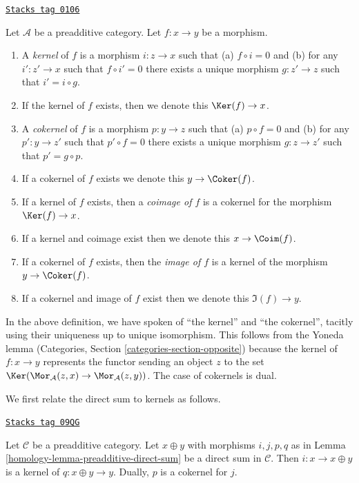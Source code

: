 \begin{definition}[Kernel]
\label{homology-definition-kernel}
\href{https://stacks.math.columbia.edu/tag/0106}{\texttt{Stacks tag 0106}}

Let $\mathcal{A}$ be a preadditive category.
Let $f : x \to y$ be a morphism.
\begin{enumerate}
\item A {\it kernel} of $f$ is a morphism
$i : z \to x$ such that (a) $f \circ i = 0$ and (b)
for any $i' : z' \to x$ such that $f \circ i' = 0$ there
exists a unique morphism $g : z' \to z$ such that
$i' = i \circ g$.
\item If the kernel of $f$ exists, then we denote
this $\Ker(f) \to x$.
\item A {\it cokernel} of $f$ is a morphism
$p : y \to z$ such that (a) $p \circ f = 0$ and (b)
for any $p' : y \to z'$ such that $p' \circ f = 0$ there
exists a unique morphism $g : z \to z'$ such that
$p' = g \circ p$.
\item If a cokernel of $f$ exists we denote this
$y \to \Coker(f)$.
\item If a kernel of $f$ exists, then a {\it coimage
of $f$} is a cokernel for the morphism $\Ker(f) \to x$.
\item If a kernel and coimage exist then we denote this
$x \to \Coim(f)$.
\item If a cokernel of $f$ exists, then the {\it image of
$f$} is a kernel of the morphism $y \to \Coker(f)$.
\item If a cokernel and image of $f$ exist then we denote
this $\Im(f) \to y$.
\end{enumerate}
\end{definition}

In the above definition, we have spoken of ``the kernel'' and
``the cokernel'', tacitly using their uniqueness
up to unique isomorphism. This follows from the Yoneda lemma
(Categories, Section \ref{categories-section-opposite})
because the kernel of $f : x \to y$ represents the functor
sending an object $z$ to the set
$\Ker(\Mor_\mathcal{A}(z, x) \to \Mor_\mathcal{A}(z, y))$.
The case of cokernels is dual.

\medskip\noindent
We first relate the direct sum to kernels as follows.

\begin{lemma}
\label{homology-lemma-additive-cat-biproduct-kernel}
\href{https://stacks.math.columbia.edu/tag/09QG}{\texttt{Stacks tag 09QG}}

Let $\mathcal{C}$ be a preadditive category.
Let $x \oplus y$ with morphisms $i, j, p, q$ as in
Lemma \ref{homology-lemma-preadditive-direct-sum}
be a direct sum in $\mathcal{C}$. Then $i : x \to x \oplus y$
is a kernel of $q : x \oplus y \rightarrow y$. Dually, $p$ is
a cokernel for $j$.
\end{lemma}

